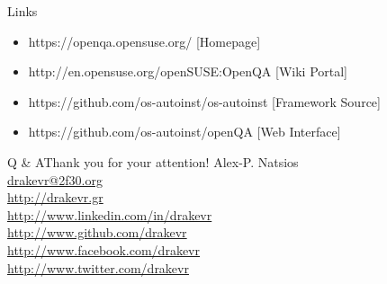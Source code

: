 \documentclass{beamer}
\begin{document}
    \begin{frame}{Links}
        \begin{itemize}
            \item https://openqa.opensuse.org/ [Homepage]
            \item http://en.opensuse.org/openSUSE:OpenQA [Wiki Portal]
            \item https://github.com/os-autoinst/os-autoinst [Framework Source]
            \item https://github.com/os-autoinst/openQA [Web Interface]
        \end{itemize}
    \end{frame}

    \begin{frame}{Q \& A}{Thank you for your attention!}
        \center Alex-P. Natsios\\
        \center\url{drakevr@2f30.org}\\
        \center\url{http://drakevr.gr}\\
        \center\url{http://www.linkedin.com/in/drakevr}\\
        \center\url{http://www.github.com/drakevr}\\
        \center\url{http://www.facebook.com/drakevr}\\
        \center\url{http://www.twitter.com/drakevr}
    \end{frame}
\end{document}
